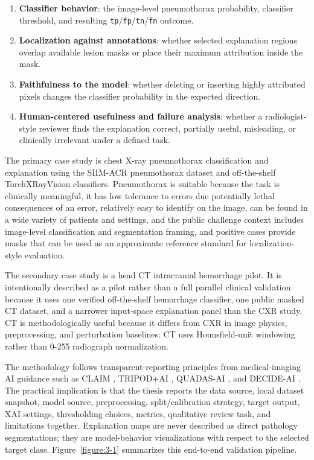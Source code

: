 \begin{enumerate}
	\def\labelenumi{\arabic{enumi}.}
	\tightlist
	\item
	\textbf{Classifier behavior}: the image-level pneumothorax
	probability, classifier threshold, and resulting
	\texttt{tp}/\texttt{fp}/\texttt{tn}/\texttt{fn} outcome.
	\item
	\textbf{Localization against annotations}: whether selected
	explanation regions overlap available lesion masks or place their
	maximum attribution inside the mask.
	\item
	\textbf{Faithfulness to the model}: whether deleting or inserting
	highly attributed pixels changes the classifier probability in the
	expected direction.
	\item
	\textbf{Human-centered usefulness and failure analysis}: whether a
	radiologist-style reviewer finds the explanation correct, partially
	useful, misleading, or clinically irrelevant under a defined task.
\end{enumerate}

The primary case study is chest X-ray pneumothorax classification and
explanation using the SIIM-ACR pneumothorax dataset and off-the-shelf
TorchXRayVision classifiers. Pneumothorax is suitable because the task
is clinically meaningful, it has low tolerance to errors due potentially 
lethal consequences of an error, relatively easy to identify on the image,
can be found in a wide variety of patients and settings, 
and the public challenge context includes
image-level classification and segmentation framing, and positive cases
provide masks that can be used as an approximate reference standard for
localization-style evaluation.

The secondary case study is a head CT intracranial hemorrhage pilot. It
is intentionally described as a pilot rather than a full parallel
clinical validation because it uses one verified off-the-shelf
hemorrhage classifier, one public masked CT dataset, and a narrower
input-space explanation panel than the CXR study. CT is methodologically
useful because it differs from CXR in image physics, preprocessing, and
perturbation baselines: CT uses Hounsfield-unit windowing rather than
0-255 radiograph normalization.

The methodology follows transparent-reporting principles from
medical-imaging AI guidance such as CLAIM \cite{ref-claim}, TRIPOD+AI
\cite{ref-tripod-ai}, QUADAS-AI \cite{ref-quadas-ai}, and DECIDE-AI
\cite{ref-decide-ai}. The practical implication is that the thesis
reports the data source, local dataset snapshot, model source,
preprocessing, split/calibration strategy, target output, XAI settings,
thresholding choices, metrics, qualitative review task, and limitations
together. Explanation maps are never described as direct pathology
segmentations; they are model-behavior visualizations with respect to
the selected target class. Figure~\ref{figure:3-1} summarizes this end-to-end
validation pipeline.

